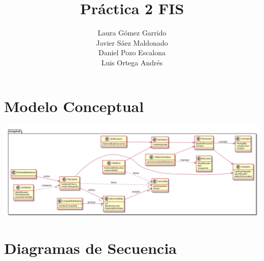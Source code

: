 \documentclass[10pt,a4paper,spanish]{report}
\title{\textbf{Práctica 2 FIS}}
\author{Laura Gómez Garrido\\
		Javier Sáez Maldonado\\
		Daniel Pozo Escalona\\
		Luis Ortega Andrés}
\begin{document}
\maketitle

\section*{Modelo Conceptual}

\begin{center}

\includegraphics[scale=0.35]{ModeloConceptual.png}

\end{center}


\newpage
\section*{Diagramas de Secuencia}
\end{document}
